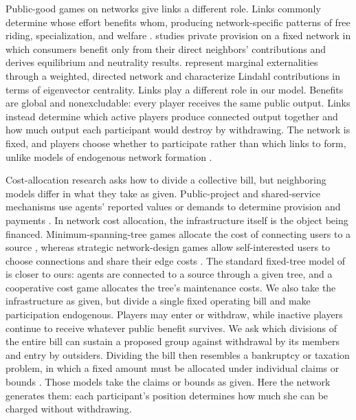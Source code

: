 \documentclass[preprint,12pt,authoryear]{elsarticle}
\begin{document}
Public-good games on networks give links a different role. Links commonly
determine whose effort benefits whom, producing network-specific patterns of
free riding, specialization, and welfare
\citep{BramoulleKranton2007,GaleottiEtAl2010}. \citet{Allouch2015} studies private provision on a fixed network in which consumers benefit only from their direct neighbors’ contributions and derives equilibrium and neutrality results. \citet{ElliottGolub2019} represent marginal externalities through a weighted, directed network and characterize Lindahl contributions in terms of eigenvector centrality. Links play a different role in our model. Benefits are global and nonexcludable: every player receives the same public output. Links instead determine which active players produce connected output together and how much output each participant would destroy by withdrawing. The network is fixed, and players choose whether to participate rather than which links to form, unlike models of endogenous network formation \citep{JacksonWolinsky1996,BalaGoyal2000}.

Cost-allocation research asks how to divide a collective bill, but neighboring models differ in what they take as given. Public-project and shared-service mechanisms use agents’ reported values or demands to determine provision and payments \citep{JacksonMoulin1992,MoulinShenker1992,Moulin1994,DebRazzolini1999,MoulinShenker2001}. In network cost allocation, the infrastructure itself is the object being financed. Minimum-spanning-tree games allocate the cost of connecting users to a source \citep{Bird1976,GranotHuberman1981}, whereas strategic network-design games allow self-interested users to choose connections and share their edge costs \citep{AnshelevichEtAl2008}. The standard fixed-tree model of \citet{TijsEtAl2002} is closer to ours: agents are connected to a source through a given tree, and a cooperative cost game allocates the tree’s maintenance costs. We also take the infrastructure as given, but divide a single fixed operating bill and make participation endogenous. Players may enter or withdraw, while inactive players continue to receive whatever public benefit survives. We ask which divisions of the entire bill can sustain a proposed group against withdrawal by its members and entry by outsiders. Dividing the bill then resembles a bankruptcy or taxation problem, in which a fixed amount must be allocated under individual claims or bounds \citep{ONeill1982,AumannMaschler1985,Thomson2003,Thomson2015}. Those models take the claims or bounds as given. Here the network generates them: each participant’s position determines how much she can be charged without withdrawing.
\end{document}
